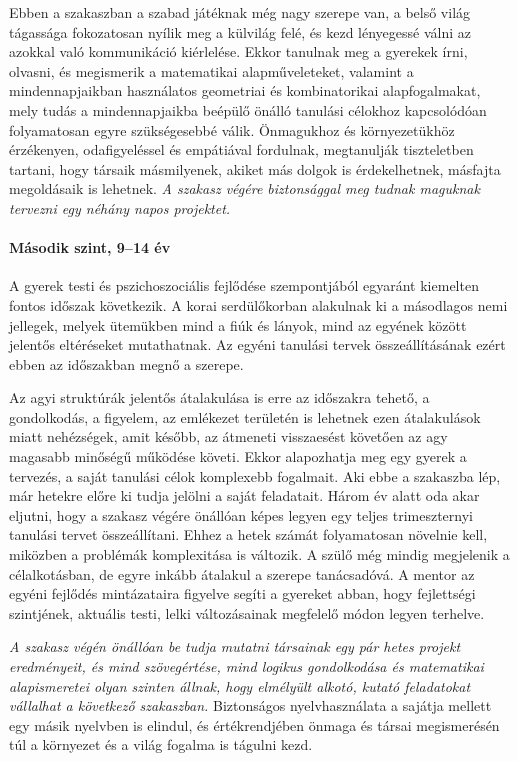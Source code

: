 Ebben a szakaszban a szabad játéknak még nagy szerepe van, a belső világ tágassága fokozatosan nyílik meg a külvilág felé, és kezd lényegessé válni az azokkal való kommunikáció kiérlelése. Ekkor tanulnak meg a gyerekek írni, olvasni, és megismerik a matematikai alapműveleteket, valamint a mindennapjaikban használatos  geometriai és kombinatorikai alapfogalmakat, mely tudás a mindennapjaikba beépülő önálló tanulási célokhoz kapcsolódóan folyamatosan egyre szükségesebbé válik. Önmagukhoz és környezetükhöz érzékenyen, odafigyeléssel és empátiával fordulnak, megtanulják tiszteletben tartani, hogy társaik másmilyenek, akiket más dolgok is érdekelhetnek, másfajta megoldásaik is lehetnek. \emph{A szakasz végére biztonsággal meg tudnak maguknak tervezni egy néhány napos projektet.}\vfill\eject

\paragraph{Második szint, 9--14 év}

A gyerek testi és pszichoszociális fejlődése szempontjából egyaránt kiemelten fontos időszak következik. A korai serdülőkorban alakulnak ki a másodlagos nemi jellegek, melyek ütemükben mind a fiúk és lányok, mind az egyének között jelentős eltéréseket mutathatnak. Az egyéni tanulási tervek összeállításának ezért ebben az időszakban megnő a szerepe.

Az agyi struktúrák jelentős átalakulása is erre az időszakra tehető, a gondolkodás, a figyelem, az emlékezet területén is lehetnek ezen átalakulások miatt nehézségek, amit később, az átmeneti visszaesést követően az agy magasabb minőségű működése követi. Ekkor alapozhatja meg egy gyerek a tervezés, a saját tanulási célok komplexebb fogalmait. Aki ebbe a szakaszba lép, már hetekre előre ki tudja jelölni a saját feladatait. Három év alatt oda akar eljutni, hogy a szakasz végére önállóan képes legyen egy teljes trimeszternyi tanulási tervet összeállítani. Ehhez a hetek számát folyamatosan növelnie kell, miközben a problémák komplexitása is változik. A szülő még mindig megjelenik a célalkotásban, de egyre inkább átalakul a szerepe tanácsadóvá. A mentor az egyéni fejlődés mintázataira figyelve segíti a gyereket abban, hogy fejlettségi szintjének, aktuális testi, lelki változásainak megfelelő módon legyen terhelve.

\emph{A szakasz végén önállóan be tudja mutatni társainak egy pár hetes projekt eredményeit, és mind szövegértése, mind logikus gondolkodása és matematikai alapismeretei olyan szinten állnak, hogy elmélyült alkotó, kutató feladatokat vállalhat a következő szakaszban.} Biztonságos nyelvhasználata a sajátja mellett egy másik nyelvben is elindul, és értékrendjében önmaga és társai megismerésén túl a környezet és a világ fogalma is tágulni kezd.

